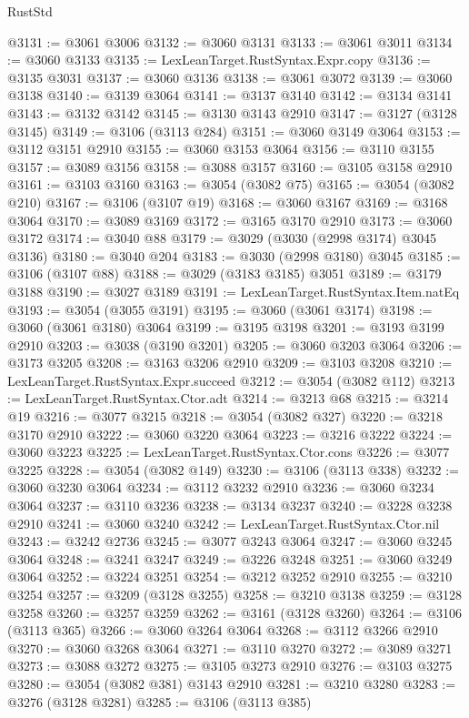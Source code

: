 \begin{lexlean}{RustStd}
\begin{coremodule}
@3131 := @3061 @3006
@3132 := @3060 @3131
@3133 := @3061 @3011
@3134 := @3060 @3133
@3135 := LexLeanTarget.RustSyntax.Expr.copy
@3136 := @3135 @3031
@3137 := @3060 @3136
@3138 := @3061 @3072
@3139 := @3060 @3138
@3140 := @3139 @3064
@3141 := @3137 @3140
@3142 := @3134 @3141
@3143 := @3132 @3142
@3145 := @3130 @3143 @2910
@3147 := @3127 (@3128 @3145)
@3149 := @3106 (@3113 @284)
@3151 := @3060 @3149 @3064
@3153 := @3112 @3151 @2910
@3155 := @3060 @3153 @3064
@3156 := @3110 @3155
@3157 := @3089 @3156
@3158 := @3088 @3157
@3160 := @3105 @3158 @2910
@3161 := @3103 @3160
@3163 := @3054 (@3082 @75)
@3165 := @3054 (@3082 @210)
@3167 := @3106 (@3107 @19)
@3168 := @3060 @3167
@3169 := @3168 @3064
@3170 := @3089 @3169
@3172 := @3165 @3170 @2910
@3173 := @3060 @3172
@3174 := @3040 @88
@3179 := @3029 (@3030 (@2998 @3174) @3045 @3136)
@3180 := @3040 @204
@3183 := @3030 (@2998 @3180) @3045
@3185 := @3106 (@3107 @88)
@3188 := @3029 (@3183 @3185) @3051
@3189 := @3179 @3188
@3190 := @3027 @3189
@3191 := LexLeanTarget.RustSyntax.Item.natEq
@3193 := @3054 (@3055 @3191)
@3195 := @3060 (@3061 @3174)
@3198 := @3060 (@3061 @3180) @3064
@3199 := @3195 @3198
@3201 := @3193 @3199 @2910
@3203 := @3038 (@3190 @3201)
@3205 := @3060 @3203 @3064
@3206 := @3173 @3205
@3208 := @3163 @3206 @2910
@3209 := @3103 @3208
@3210 := LexLeanTarget.RustSyntax.Expr.succeed
@3212 := @3054 (@3082 @112)
@3213 := LexLeanTarget.RustSyntax.Ctor.adt
@3214 := @3213 @68
@3215 := @3214 @19
@3216 := @3077 @3215
@3218 := @3054 (@3082 @327)
@3220 := @3218 @3170 @2910
@3222 := @3060 @3220 @3064
@3223 := @3216 @3222
@3224 := @3060 @3223
@3225 := LexLeanTarget.RustSyntax.Ctor.cons
@3226 := @3077 @3225
@3228 := @3054 (@3082 @149)
@3230 := @3106 (@3113 @338)
@3232 := @3060 @3230 @3064
@3234 := @3112 @3232 @2910
@3236 := @3060 @3234 @3064
@3237 := @3110 @3236
@3238 := @3134 @3237
@3240 := @3228 @3238 @2910
@3241 := @3060 @3240
@3242 := LexLeanTarget.RustSyntax.Ctor.nil
@3243 := @3242 @2736
@3245 := @3077 @3243 @3064
@3247 := @3060 @3245 @3064
@3248 := @3241 @3247
@3249 := @3226 @3248
@3251 := @3060 @3249 @3064
@3252 := @3224 @3251
@3254 := @3212 @3252 @2910
@3255 := @3210 @3254
@3257 := @3209 (@3128 @3255)
@3258 := @3210 @3138
@3259 := @3128 @3258
@3260 := @3257 @3259
@3262 := @3161 (@3128 @3260)
@3264 := @3106 (@3113 @365)
@3266 := @3060 @3264 @3064
@3268 := @3112 @3266 @2910
@3270 := @3060 @3268 @3064
@3271 := @3110 @3270
@3272 := @3089 @3271
@3273 := @3088 @3272
@3275 := @3105 @3273 @2910
@3276 := @3103 @3275
@3280 := @3054 (@3082 @381) @3143 @2910
@3281 := @3210 @3280
@3283 := @3276 (@3128 @3281)
@3285 := @3106 (@3113 @385)

\end{coremodule}
\end{lexlean}
